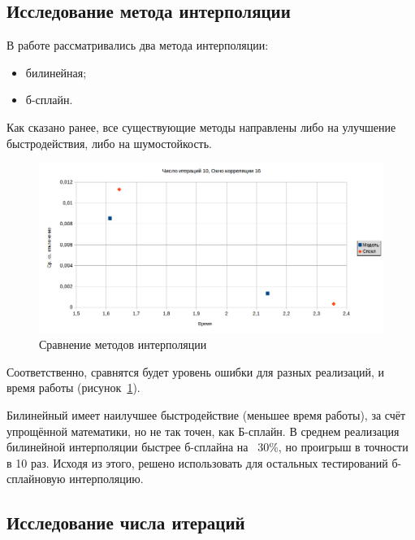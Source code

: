 \subsection{Исследование метода интерполяции}
В работе рассматривались два метода интерполяции:
\begin{itemize}
\item билинейная;
\item б-сплайн.
\end{itemize}
Как сказано ранее, все существующие методы направлены либо на улучшение быстродействия, либо на шумостойкость. 
\begin{figure}
\centering
\includegraphics[width=0.8\linewidth]{images/srav_iterpol.png}
\caption{Сравнение методов интерполяции}
\label{fig:srav_iterpol}
\end{figure}
Соответственно, сравнятся будет уровень ошибки для разных реализаций, и время работы (рисунок~\ref{fig:srav_iterpol}).

Билинейный имеет наилучшее быстродействие (меньшее время работы), за счёт упрощённой математики, но не так точен, как Б-сплайн. В среднем реализация билинейной интерполяции быстрее б-сплайна на ~30\%, но проигрыш в точности в 10 раз. Исходя из этого, решено использовать для остальных тестирований б-сплайновую интерполяцию. 
\subsection{Исследование числа итераций}

